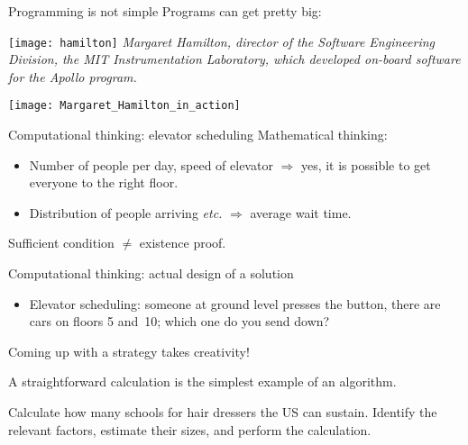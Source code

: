 \begin{block}{Programming is not simple}
  \label{sl:hamilton}
  \small
  Programs can get pretty big:

  \begin{multicols}{2}
    \texttt{[image: hamilton]}
    \vfill\columnbreak
    \textsl
    {\small Margaret Hamilton, director of the Software Engineering Division,
    the MIT Instrumentation Laboratory, which developed on-board
    software for the Apollo program.}\par
    \texttt{[image: Margaret\_Hamilton\_in\_action]}
    \vfill\hbox{}\columnbreak
  \end{multicols}



\end{block}

\begin{block}{Computational thinking: elevator scheduling}
  \label{sl:elevator}
  Mathematical thinking:
  \begin{itemize}
  \item Number of people per day, speed of elevator $\Rightarrow$ yes,
    it is possible to get everyone to the right floor.
  \item Distribution of people arriving \emph{etc.} $\Rightarrow$
    average wait time.
  \end{itemize}
  Sufficient condition $\not=$ existence proof.

  Computational thinking: actual design of a solution
  \begin{itemize}
  \item Elevator scheduling: someone at ground level presses the
    button, there are cars on floors 5 and~10; which one do you send down?
  \end{itemize}
  Coming up with a strategy takes creativity!
\end{block}

\begin{exercise}
  \label{ex:hair}
  A straightforward calculation is the simplest example of an
  algorithm.

  Calculate how many schools for hair dressers the US can
  sustain. Identify the relevant factors, estimate their sizes, and
  perform the calculation.
\end{exercise}

